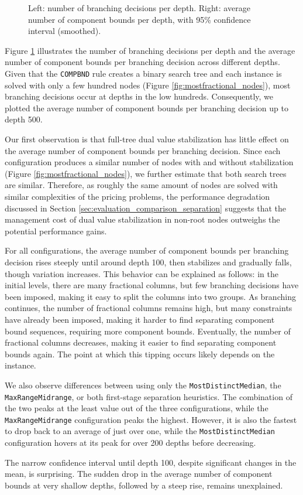 \begin{figure}
	\caption{Left: number of branching decisions per depth. Right: average number of component bounds per depth, with 95\% confidence interval (smoothed).}
	\label{fig:comparison_depth}
\end{figure}

Figure \ref{fig:comparison_depth} illustrates the number of branching decisions per depth and the average number of component bounds per branching decision across different depths. Given that the \texttt{COMPBND} rule creates a binary search tree and each instance is solved with only a few hundred nodes (Figure \ref{fig:mostfractional_nodes}), most branching decisions occur at depths in the low hundreds. Consequently, we plotted the average number of component bounds per branching decision up to depth 500.

Our first observation is that full-tree dual value stabilization has little effect on the average number of component bounds per branching decision. Since each configuration produces a similar number of nodes with and without stabilization (Figure \ref{fig:mostfractional_nodes}), we further estimate that both search trees are similar. Therefore, as roughly the same amount of nodes are solved with similar complexities of the pricing problems, the performance degradation discussed in Section \ref{sec:evaluation_comparison_separation} suggests that the management cost of dual value stabilization in non-root nodes outweighs the potential performance gains.

For all configurations, the average number of component bounds per branching decision rises steeply until around depth 100, then stabilizes and gradually falls, though variation increases. This behavior can be explained as follows: in the initial levels, there are many fractional columns, but few branching decisions have been imposed, making it easy to split the columns into two groups. As branching continues, the number of fractional columns remains high, but many constraints have already been imposed, making it harder to find separating component bound sequences, requiring more component bounds. Eventually, the number of fractional columns decreases, making it easier to find separating component bounds again. The point at which this tipping occurs likely depends on the instance.

We also observe differences between using only the \texttt{MostDistinctMedian}, the \texttt{MaxRangeMidrange}, or both first-stage separation heuristics. The combination of the two peaks at the least value out of the three configurations, while the \texttt{MaxRangeMidrange} configuration peaks the highest. However, it is also the fastest to drop back to an average of just over one, while the \texttt{MostDistinctMedian} configuration hovers at its peak for over 200 depths before decreasing.

The narrow confidence interval until depth 100, despite significant changes in the mean, is surprising. The sudden drop in the average number of component bounds at very shallow depths, followed by a steep rise, remains unexplained.
